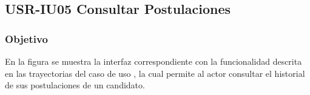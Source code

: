 \clearpage
\subsection{USR-IU05 Consultar Postulaciones}

\subsubsection{Objetivo}
En la figura  se muestra la interfaz correspondiente con la funcionalidad descrita en las
trayectorias del caso de uso  , la cual permite al actor consultar el historial de sus postulaciones de un candidato.




\clearpage
